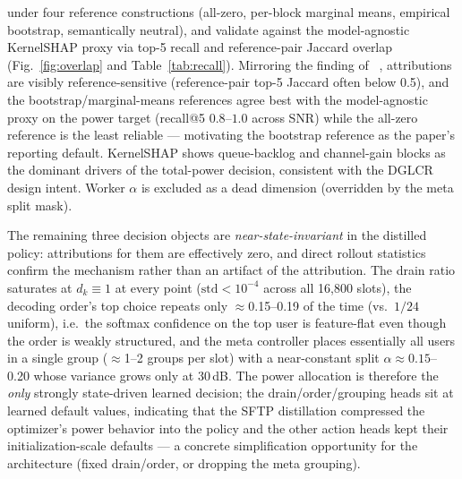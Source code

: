 \documentclass[journal]{IEEEtran}
\begin{document}
under four reference constructions (all-zero, per-block marginal means, empirical
bootstrap, semantically neutral), and validate against the model-agnostic KernelSHAP
proxy via top-5 recall and reference-pair Jaccard overlap
(Fig.~\ref{fig:overlap} and Table~\ref{tab:recall}). Mirroring the finding of
~\cite{fernando2019deepshap}, attributions are visibly reference-sensitive
(reference-pair top-5 Jaccard often below 0.5), and the bootstrap/marginal-means
references agree best with the model-agnostic proxy on the power target
(recall@5 $0.8$--$1.0$ across SNR) while the all-zero reference is the least
reliable --- motivating the bootstrap reference as the paper's reporting default.
KernelSHAP shows queue-backlog and channel-gain blocks as the dominant drivers of
the total-power decision, consistent with the DGLCR design intent. Worker $\alpha$
is excluded as a dead dimension (overridden by the meta split mask).

The remaining three decision objects are \emph{near-state-invariant} in the
distilled policy: attributions for them are effectively zero, and direct rollout
statistics confirm the mechanism rather than an artifact of the attribution.
The drain ratio saturates at $d_k \equiv 1$ at every point ($\mathrm{std} < 10^{-4}$
across all 16{,}800 slots), the decoding order's top choice repeats only
$\approx$0.15--0.19 of the time (vs.\ $1/24$ uniform), i.e.\ the softmax
confidence on the top user is feature-flat even though the order is weakly
structured, and the meta controller places essentially all users in a single
group ($\approx$1--2 groups per slot) with a near-constant split
$\alpha \approx 0.15$--0.20 whose variance grows only at 30\,dB. The power
allocation is therefore the \emph{only} strongly state-driven learned decision;
the drain/order/grouping heads sit at learned default values, indicating that
the SFTP distillation compressed the optimizer's power behavior into the policy
and the other action heads kept their initialization-scale defaults --- a
concrete simplification opportunity for the architecture (fixed drain/order,
or dropping the meta grouping).
\end{document}
